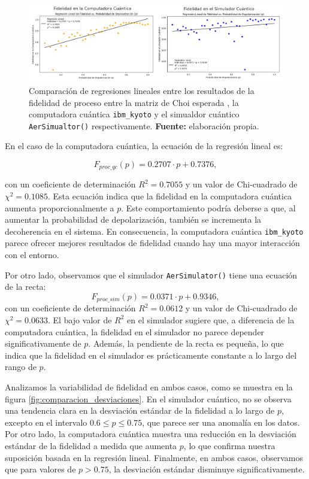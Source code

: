 \documentclass[letterpaper,12pt]{thesisECFM}
\theoremstyle{plain}
\theoremstyle{definition}
\theoremstyle{remark}
\newcommand{\1}{\mathbb{1}}
\begin{document}
\begin{figure}[h!]
    \centering
    \includegraphics[width=0.95\linewidth]{imagenes/Comparacion_regresiones.png}
    \caption{Comparación de regresiones lineales entre los resultados de la fidelidad de proceso entre la matriz de Choi esperada , la computadora cuántica \texttt{ibm\_kyoto} y el simualdor cuántico \texttt{AerSimualtor()} respectivamente. \textbf{Fuente:} elaboración propia.}
    \label{fig:comparacion_regresiones}
\end{figure}

En el caso de la computadora cuántica, la ecuación de la regresión lineal es:

\begin{equation}
    F_{proc\_qc}(p) = 0.2707 \cdot p + 0.7376,
\end{equation}

con un coeficiente de determinación $R^2 = 0.7055$ y un valor de Chi-cuadrado de $\chi^2 = 0.1085$. Esta ecuación indica que la fidelidad en la computadora cuántica aumenta proporcionalmente a $p$. Este comportamiento podría deberse a que, al aumentar la probabilidad de depolarización, también se incrementa la decoherencia en el sistema. En consecuencia, la computadora cuántica \texttt{ibm\_kyoto} parece ofrecer mejores resultados de fidelidad cuando hay una mayor interacción con el entorno.

Por otro lado, observamos que el simulador \texttt{AerSimulator()} tiene una ecuación de la recta:
\begin{equation}
    F_{proc\_sim}(p) = 0.0371 \cdot p + 0.9346,
\end{equation}
con un coeficiente de determinación $R^2 = 0.0612$ y un valor de Chi-cuadrado de $\chi^2 = 0.0633$. El bajo valor de $R^2$ en el simulador sugiere que, a diferencia de la computadora cuántica, la fidelidad en el simulador no parece depender significativamente de $p$. Además, la pendiente de la recta es pequeña, lo que indica que la fidelidad en el simulador es prácticamente constante a lo largo del rango de $p$.

Analizamos la variabilidad de fidelidad en ambos casos, como se muestra en la figura \ref{fig:comparacion_desviaciones}. En el simulador cuántico, no se observa una tendencia clara en la desviación estándar de la fidelidad a lo largo de $p$, excepto en el intervalo $0.6 \le p \leq 0.75$, que parece ser una anomalía en los datos. Por otro lado, la computadora cuántica muestra una reducción en la desviación estándar de la fidelidad a medida que aumenta $p$, lo que confirma nuestra suposición basada en la regresión lineal. Finalmente, en ambos casos, observamos que para valores de $p>0.75$, la desviación estándar disminuye significativamente.
\end{document}
